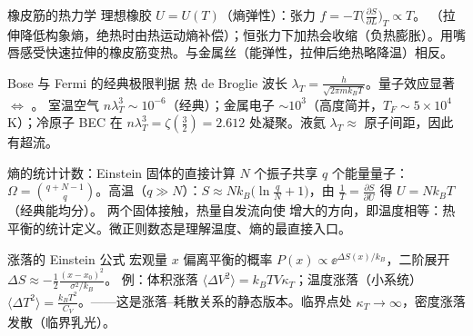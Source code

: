 \begin{结论}{橡皮筋的热力学}
理想橡胶 $U=U(T)$（熵弹性）：张力 $f=-T\bigl(\frac{\partial S}{\partial L}\bigr)_T\propto T$。
（拉伸降低构象熵，绝热时由热运动熵补偿）；恒张力下加热会收缩（负热膨胀）。用嘴唇感受快速拉伸的橡皮筋变热。与金属丝（能弹性，拉伸后绝热略降温）相反。
\end{结论}

\begin{结论}{Bose 与 Fermi 的经典极限判据}
热 de Broglie 波长 $\lambda_T=\frac{h}{\sqrt{2\pi mk_BT}}$。量子效应显著 $\iff$ 。
室温空气 $n\lambda_T^3\sim10^{-6}$（经典）；金属电子 $\sim10^3$（高度简并，$T_F\sim5\times10^4$ K）；冷原子 BEC 在 $n\lambda_T^3=\zeta(\frac32)=2.612$ 处凝聚。液氦 $\lambda_T\approx$ 原子间距，因此有超流。
\end{结论}

\begin{结论}{熵的统计计数：Einstein 固体的直接计算}
$N$ 个振子共享 $q$ 个能量量子：$\Omega=\binom{q+N-1}{q}$。高温（$q\gg N$）：$S\approx Nk_B\bigl(\ln\frac qN+1\bigr)$，由 $\frac1T=\frac{\partial S}{\partial U}$ 得 $U=Nk_BT$（经典能均分）。
两个固体接触，热量自发流向使  增大的方向，即温度相等：热平衡的统计定义。微正则数态是理解温度、熵的最直接入口。
\end{结论}

\begin{结论}{涨落的 Einstein 公式}
宏观量 $x$ 偏离平衡的概率 $P(x)\propto\ee^{\Delta S(x)/k_B}$，二阶展开 $\Delta S\approx-\frac12\frac{(x-x_0)^2}{\sigma^2/k_B}$。
例：体积涨落 $\langle\Delta V^2\rangle=k_BTV\kappa_T$；温度涨落（小系统）$\langle\Delta T^2\rangle=\frac{k_BT^2}{C_V}$。——这是涨落--耗散关系的静态版本。临界点处 $\kappa_T\to\infty$，密度涨落发散（临界乳光）。
\end{结论}

